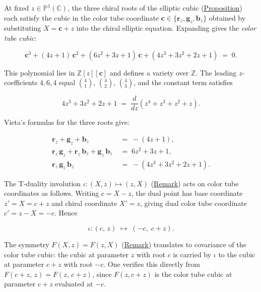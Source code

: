\begin{remark}
  \label{rem:color-tube-cubic}
At fixed $z \in \mathbb{P}^1(\mathbb{C})$, the three chiral roots of the
elliptic cubic (\hyperref[prop:chiral-elliptic]{Proposition}) each satisfy the cubic in
the color tube coordinate $\mathbf{c} \in \{\mathbf{r}_z, \mathbf{g}_z, \mathbf{b}_z\}$
obtained by substituting $X = \mathbf{c} + z$
into the chiral elliptic equation.  Expanding gives the
\emph{color tube cubic}:

\begin{equation}\label{eq:color-tube-cubic}
  \mathbf{c}^3 + (4z+1)\,\mathbf{c}^2 + (6z^2+3z+1)\,\mathbf{c}
  + (4z^3+3z^2+2z+1) \;=\; 0.
\end{equation}

This polynomial lies in $\mathbb{Z}[z][\mathbf{c}]$ and defines a
variety over $\mathbb{Z}$.  The leading $z$-coefficients $4, 6, 4$
equal $\binom{4}{1}$, $\binom{4}{2}$, $\binom{4}{3}$, and the
constant term satisfies

\[
4z^3 + 3z^2 + 2z + 1 \;=\; \frac{d}{dz}(z^4 + z^3 + z^2 + z).
\]

Vieta's formulas for the three roots give:

\begin{align}
  \mathbf{r}_z + \mathbf{g}_z + \mathbf{b}_z
    &\;=\; -(4z+1),
    \label{eq:vieta-sum}\\[4pt]
  \mathbf{r}_z\,\mathbf{g}_z + \mathbf{r}_z\,\mathbf{b}_z
    + \mathbf{g}_z\,\mathbf{b}_z
    &\;=\; 6z^2+3z+1,
    \label{eq:vieta-pairs}\\[4pt]
  \mathbf{r}_z\,\mathbf{g}_z\,\mathbf{b}_z
    &\;=\; -(4z^3+3z^2+2z+1).
    \label{eq:vieta-product}
\end{align}
\end{remark}

\begin{remark}
  \label{rem:t-duality-color-tube}
The T-duality involution $\iota \colon (X, z) \mapsto (z, X)$
(\hyperref[rem:t-duality-elliptic]{Remark}) acts on color tube
coordinates as follows.  Writing $c = X - z$, the dual point has
base coordinate $z' = X = c + z$ and chiral coordinate $X' = z$,
giving dual color tube coordinate $c' = z - X = -c$.  Hence

\begin{equation}\label{eq:t-duality-color-tube}
  \iota \colon (c,\, z) \;\longmapsto\; (-c,\; c + z).
\end{equation}

The symmetry $F(X,z) = F(z,X)$
(\hyperref[rem:t-duality-elliptic]{Remark}) translates to covariance of
the color tube cubic: the cubic at
parameter $z$ with root $c$ is carried by $\iota$ to the cubic at
parameter $c + z$ with root $-c$.  One verifies this directly from
$F(c+z,\, z) = F(z,\, c+z)$, since $F(z, c+z)$ is the color tube
cubic at parameter $c+z$ evaluated at $-c$.
\end{remark}

